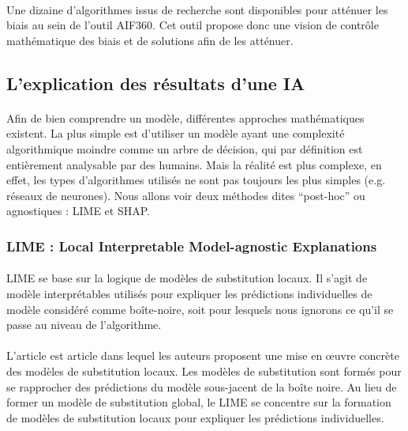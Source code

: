 \documentclass[10pt, french, a4paper]{report}
\begin{document}
\paragraph{}
Une dizaine d’algorithmes issus de recherche sont disponibles pour atténuer les biais au sein de l’outil AIF360. Cet outil propose donc une vision de contrôle mathématique des biais et de solutions afin de les atténuer.

\subsection{L'explication des résultats d'une IA}

\paragraph{}
Afin de bien comprendre un modèle, différentes approches mathématiques existent. La plus simple est d'utiliser un modèle ayant une complexité algorithmique moindre comme un arbre de décision, qui par définition est entièrement analysable par des humains. Mais la réalité est plus complexe, en effet, les types d'algorithmes utilisés ne sont pas toujours les plus simples (e.g. réseaux de neurones). Nous allons voir deux méthodes dites ``post-hoc'' ou agnostiques : LIME et SHAP.

\subsubsection{LIME : Local Interpretable Model-agnostic Explanations}

\paragraph{}
LIME se base sur la logique de modèles de substitution locaux. Il s'agit de modèle interprétables utilisés pour expliquer les prédictions individuelles de modèle considéré comme boîte-noire, soit pour lesquels nous ignorons ce qu'il se passe au niveau de l'algorithme.

\paragraph{}
L'article \citep{lime} est article dans lequel les auteurs proposent une mise en œuvre concrète des modèles de substitution locaux. Les modèles de substitution sont formés pour se rapprocher des prédictions du modèle sous-jacent de la boîte noire. Au lieu de former un modèle de substitution global, le LIME se concentre sur la formation de modèles de substitution locaux pour expliquer les prédictions individuelles.
\end{document}
